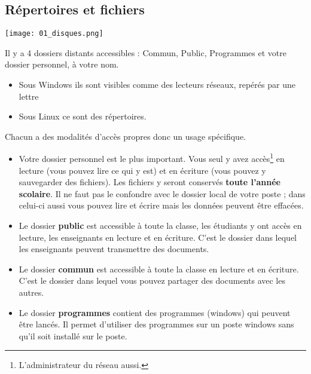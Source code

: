 \subsection{Répertoires et fichiers}
\begin{center}
\texttt{[image: 01\_disques.png]} 
\end{center}
Il y a 4 dossiers distants accessibles : Commun, Public, Programmes et votre dossier personnel, à votre nom.
\begin{itemize}

\item Sous Windows ils sont visibles comme des lecteurs réseaux, repérés par une lettre

\item Sous Linux ce sont des répertoires.

\end{itemize}
Chacun a des modalités d'accès propres donc un usage spécifique.
\begin{itemize}

\item Votre dossier personnel est le plus important. Vous seul y avez accès\footnote{L'administrateur du réseau aussi.} en lecture (vous pouvez lire ce qui y est) et en écriture (vous pouvez y sauvegarder des fichiers). Les fichiers y seront conservés {\bf toute l'année scolaire}. Il ne faut pas le confondre avec le dossier local de votre poste ; dans celui-ci aussi vous pouvez lire et écrire mais les données peuvent être effacées.

\item Le dossier {\bf public} est accessible à toute la classe, les étudiants y ont accès en lecture, les enseignants en lecture et en écriture. C'est le dossier dans lequel les enseignants peuvent transmettre des documents.

\item Le dossier {\bf commun} est accessible à toute la classe en lecture et en écriture. C'est le dossier dans lequel vous pouvez partager des documents avec les autres.

\item Le dossier {\bf programmes} contient des programmes (windows) qui peuvent être lancés. Il permet d'utiliser des programmes sur un poste windows sans qu'il soit installé sur le poste.

\end{itemize}

